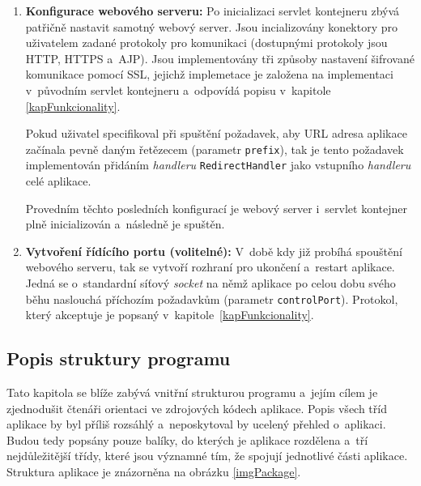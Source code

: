 \begin{enumerate}
                
                \item \textbf{Konfigurace webového serveru:} 
                    Po inicializaci servlet kontejneru zbývá patřičně nastavit 
                    samotný webový server. Jsou incializovány konektory pro uživatelem zadané
                    protokoly pro komunikaci (dostupnými protokoly jsou HTTP, HTTPS a~AJP). 
                    Jsou implementovány tři způsoby nastavení šifrované komunikace pomocí SSL, jejichž 
                    implemetace je založena na implementaci v~původním servlet kontejneru
                    a~odpovídá popisu v~kapitole \ref{kapFunkcionality}.
                    
                    Pokud uživatel specifikoval při spuštění požadavek, 
                    aby  URL adresa aplikace začínala 
                    pevně daným řetězecem (parametr \texttt{prefix}), tak je tento požadavek implementován
                    přidáním \emph{handleru} \texttt{RedirectHandler} jako vstupního \emph{handleru}
                    celé aplikace.

                    Provedním těchto posledních konfigurací je webový server i~servlet kontejner
                    plně inicializován a~následně je spuštěn.
                
                \item \textbf{Vytvoření řídícího portu (volitelné):} 
                    V~době kdy již probíhá spouštění webového serveru, 
                    tak se vytvoří rozhraní pro ukončení a~restart aplikace.
                    Jedná se o~standardní síťový \emph{socket} na němž aplikace 
                    po celou dobu svého běhu naslouchá příchozím požadavkům (parametr \texttt{controlPort}). 
                    Protokol, který akceptuje je popsaný v~kapitole~\ref{kapFunkcionality}.

            \end{enumerate}




        \subsection{Popis struktury programu}
            Tato kapitola se blíže zabývá vnitřní strukturou programu a~jejím cílem je zjednodušit 
            čtenáři orientaci ve zdrojových kódech aplikace.
            Popis všech tříd aplikace by byl příliš rozsáhlý a~neposkytoval by ucelený přehled o~aplikaci.
            Budou tedy popsány pouze balíky, do kterých je aplikace rozdělena
            a~tří nejdůležitější třídy, které jsou významné tím, že spojují jednotlivé části aplikace.
            Struktura aplikace je znázorněna na obrázku \ref{imgPackage}.
                    
